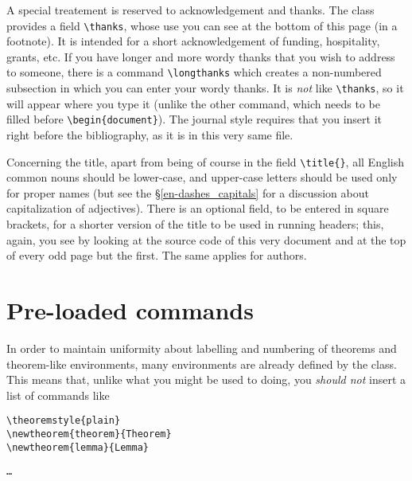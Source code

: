 \documentclass[Unicode]{cedram-alco}
\begin{document}
A special treatement is reserved to acknowledgement and thanks. The
class provides a field \verb|\thanks|, whose use you can see at the
bottom of this page (in a footnote). It is intended for a short
acknowledgement of funding, hospitality, grants, etc. If you have
longer and more wordy thanks that you wish to address to someone,
there is a command \verb|\longthanks| which creates a non-numbered
subsection in which you can enter your wordy thanks. It is \emph{not}
like \verb|\thanks|, so it will appear where you type it (unlike the
other command, which needs to be filled before
\verb|\begin{document}|). The journal style requires that you insert
it right before the bibliography, as it is in this very same file.


Concerning the title, apart from being of course in the field
\verb|\title{}|, all English common nouns should be lower-case, and
upper-case letters should be used only for proper names (but see the
\S \ref{en-dashes_capitals} for a discussion about capitalization of
adjectives). There is an optional field, to be entered in square
brackets, for a shorter version of the title to be used in running
headers; this, again, you see by looking at the source code of this
very document and at the top of every odd page but the first. The same
applies for authors.

\section{Pre-loaded commands}

In order to maintain uniformity about labelling and numbering of
theorems and theorem-like environments, many environments are already
defined by the class. This means that, unlike what you might be used
to doing, you \emph{should not} insert a list of commands like
\begin{verbatim}
\theoremstyle{plain}
\newtheorem{theorem}{Theorem}
\newtheorem{lemma}{Lemma}
\end{verbatim}
\texttt{\dots}
\end{document}

